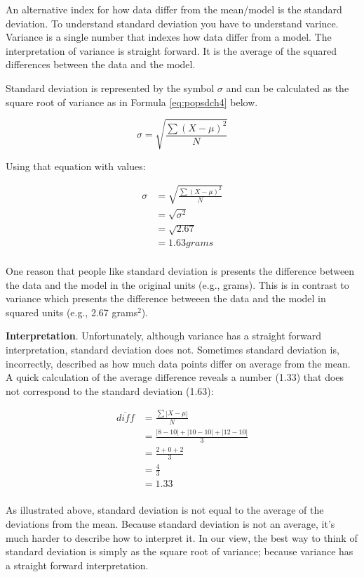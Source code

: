 \documentclass[
]{krantz}
\begin{document}
An alternative index for how data differ from the mean/model is the standard deviation. To understand standard deviation you have to understand varince. Variance is a single number that indexes how data differ from a model. The interpretation of variance is straight forward. It is the average of the squared differences between the data and the model.

Standard deviation is represented by the symbol \(\sigma\) and can be calculated as the square root of variance as in Formula \eqref{eq:popsdch4} below.

\begin{equation} 
\sigma = \sqrt{\frac{\sum{(X - \mu)^2}}{N}}
      \label{eq:popsdch4}
\end{equation}

Using that equation with values:

\[
\begin{aligned} 
\sigma &= \sqrt{\frac{\sum{(X - \mu)^2}}{N}}\\
&= \sqrt{\sigma^2} \\
&= \sqrt{2.67} \\
&= 1.63 grams\\
\end{aligned} 
\]

One reason that people like standard deviation is presents the difference between the data and the model in the original units (e.g., grams). This is in contrast to variance which presents the difference betweeen the data and the model in squared units (e.g., 2.67 grams\(^2\)).

\textbf{Interpretation}. Unfortunately, although variance has a straight forward interpretation, standard deviation does not. Sometimes standard deviation is, incorrectly, described as how much data points differ on average from the mean. A quick calculation of the average difference reveals a number (1.33) that does not correspond to the standard deviation (1.63):

\[
\begin{aligned} 
\overline{diff} &= \frac{\sum{|X - \mu|}}{N}\\
&= \frac{|8-10| + |10-10| + |12 - 10|}{3}\\
&= \frac{2 + 0 + 2}{3}\\
&= \frac{4}{3}\\
&= 1.33\\
\end{aligned} 
\]

As illustrated above, standard deviation is not equal to the average of the deviations from the mean. Because standard deviation is not an average, it's much harder to describe how to interpret it. In our view, the best way to think of standard deviation is simply as the square root of variance; because variance has a straight forward interpretation.
\end{document}
